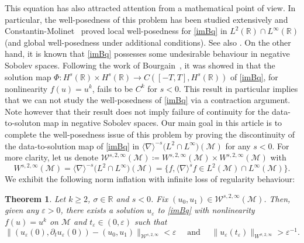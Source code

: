 \documentclass[letterpaper, 11pt,  reqno]{amsart}
\newtheorem{theorem}{Theorem} [section]
\newcommand{\1}{\hspace{0.5mm}\text{I}\hspace{0.5mm}}
\newcommand{\noi}{\noindent}
\newcommand{\R}{\mathbb{R}}
\newcommand{\M}{\mathcal{M}}
\newcommand{\nb}{\nabla}
\newcommand{\eps}{\varepsilon}
\newcommand{\s}{\sigma}
\newcommand{\dt}{\partial_t}
\newcommand{\jb}[1]
{\langle #1 \rangle}
\newcommand{\W}{\mathcal{W}}
\numberwithin{equation}{section}
\numberwithin{theorem}{section}
\begin{document}
This equation has also attracted attention from a mathematical point of view. In particular, the well-posedness of this problem has been studied extensively and Constantin-Molinet~\cite{CM} proved local well-posedness for \eqref{imBq} in $L^2(\R) \cap L^{\infty}(\R)$ (and global well-posedness under additional conditions). See also \cite{CO, GL, Zhi}. On the other hand, it is known that \eqref{imBq} possesses some undesirable behaviour in negative Sobolev spaces. Following the work of Bourgain~\cite{Bou97}, it was showed in \cite{GL} that the solution map $\Phi \colon H^s(\R) \times H^s (\R)\to C([-T,T], H^s(\R))$ of \eqref{imBq}, for nonlinearity $f(u) = u^k$, fails to be $C^k$ for $s< 0$. This result in particular implies that we can not study the well-posedness of \eqref{imBq} via a contraction argument. Note however that their result does not imply failure of continuity for the data-to-soluton map in negative Sobolev spaces. Our main goal in this article is to complete the well-posedness issue of this problem by proving the discontinuity of the data-to-solution map of \eqref{imBq} in $\jb{\nb}^{-s}\big(L^2 \cap L^\infty\big) (\M)$ for any $s < 0$. For more clarity, let us denote $\W^{s, 2, \infty}(\M) \coloneqq W^{s, 2, \infty}(\M) \times W^{s, 2, \infty}(\M)$ with
$$
W^{s, 2, \infty}(\M) = \jb{\nb}^{-s}\big(L^2 \cap L^\infty\big) (\M) = \{ f, \jb{\nb}^sf \in L^2 (\M) \cap L^\infty (\M)\}.
$$
\noi We exhibit the following norm inflation with infinite loss of regularity behaviour:




\begin{theorem}
\label{THM:mainLinfty}
Let $k \geq 2$, $\s \in \R$ and $s < 0$. Fix $(u_0 , u_1) \in \W^{s, 2, \infty} (\M)$. Then, given any $\eps > 0$, there exists a solution $u_\eps$ to \eqref{imBq} with nonlinearity $f(u) = u^k$ on $\M$ and $t_\eps \in (0, \eps)$ such that
\begin{equation}
\label{EQ:NIwithILORLinfty}
\| (u_\eps (0), \dt u_\eps (0)) - (u_0 , u_1) \|_{ \W^{s, 2, \infty}} < \eps \quad \text{ and } \quad \| u_\eps (t_\eps) \|_{W^{\s, 2, \infty}} > \eps^{-1}.
\end{equation}
\end{theorem}
\end{document}
